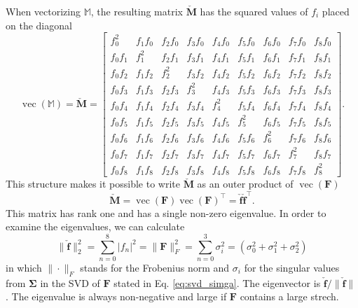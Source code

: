 When vectorizing $\mathbb{M}$, the resulting matrix $\mathbf{\check{M}}$ has the squared values of $f_i$ placed on the diagonal
\[
\operatorname{vec}(\mathbb{M})= \mathbf{\check{M}} = \begin{bmatrix} f_0^2 & f_1f_0 & f_2f_0 & f_3f_0 & f_4f_0 & f_5f_0 & f_6f_0 & f_7f_0 & f_8f_0 \\ f_0f_1 & f_1^2 & f_2f_1 & f_3f_1 & f_4f_1 & f_5f_1 & f_6f_1 & f_7f_1 & f_8f_1 \\ f_0f_2 & f_1f_2 & f_2^2 & f_3f_2 & f_4f_2 & f_5f_2 & f_6f_2 & f_7f_2 & f_8f_2 \\ f_0f_3 & f_1f_3 & f_2f_3 & f_3^2 & f_4f_3 & f_5f_3 & f_6f_3 & f_7f_3 & f_8f_3 \\ f_0f_4 & f_1f_4 & f_2f_4 & f_3f_4 & f_4^2 & f_5f_4 & f_6f_4 & f_7f_4 & f_8f_4 \\ f_0f_5 & f_1f_5 & f_2f_5 & f_3f_5 & f_4f_5 & f_5^2 & f_6f_5 & f_7f_5 & f_8f_5 \\ f_0f_6 & f_1f_6 & f_2f_6 & f_3f_6 & f_4f_6 & f_5f_6 & f_6^2 & f_7f_6 & f_8f_6 \\ f_0f_7 & f_1f_7 & f_2f_7 & f_3f_7 & f_4f_7 & f_5f_7 & f_6f_7 & f_7^2 & f_8f_7 \\ f_0f_8 & f_1f_8 & f_2f_8 & f_3f_8 & f_4f_8 & f_5f_8 & f_6f_8 & f_7f_8 & f_8^2 \end{bmatrix}.
\]
This structure makes it possible to write $\mathbf{\check{M}}$ as an outer product of $\operatorname{vec}(\mathbf{F})$
\[
\mathbf{\check{M}}= \operatorname{vec}(\mathbf{F})\operatorname{vec}(\mathbf{F})^\intercal = \mathbf{\check{f}} \mathbf{\check{f}}^\intercal.
\]
This matrix has rank one and has a single non-zero eigenvalue. In order to examine the eigenvalues, we can calculate
\[
\| \mathbf{\check{f}} \|^{2}_{2} = \sum_{n=0}^8 | f_n |^2 = \| \mathbf{F} \|^{2}_{F} = \sum_{n=0}^3 \sigma^2_i = \left( \sigma_0^2 + \sigma_1^2 + \sigma_2^2 \right)
\]
in which $\|\cdot\|_F$ stands for the Frobenius norm and $\sigma_i$ for the singular values from $\mathbf{\Sigma}$ in the SVD of $\mathbf{F}$ stated in Eq. \ref{eq:svd_simga}. The eigenvector is $\mathbf{\check{f}} / \| \mathbf{\check{f}} \|$. The eigenvalue is always non-negative and large if $\mathbf{F}$ contains a large strech.

